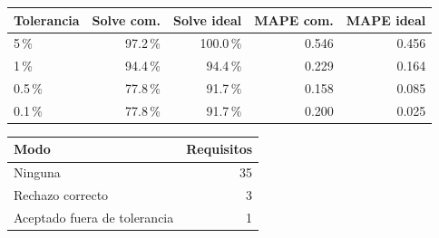 \begin{tabular}{lrrrr}
\toprule
\textbf{Tolerancia} & \textbf{Solve com.} & \textbf{Solve ideal} & \textbf{MAPE com.} & \textbf{MAPE ideal} \\
\midrule
5\,\% & 97.2\,\% & 100.0\,\% & 0.546 & 0.456 \\
1\,\% & 94.4\,\% & 94.4\,\% & 0.229 & 0.164 \\
0.5\,\% & 77.8\,\% & 91.7\,\% & 0.158 & 0.085 \\
0.1\,\% & 77.8\,\% & 91.7\,\% & 0.200 & 0.025 \\
\bottomrule
\end{tabular}

\begin{tabular}{lr}
\toprule
\textbf{Modo} & \textbf{Requisitos} \\
\midrule
Ninguna & 35 \\
Rechazo correcto & 3 \\
Aceptado fuera de tolerancia & 1 \\
\bottomrule
\end{tabular}

